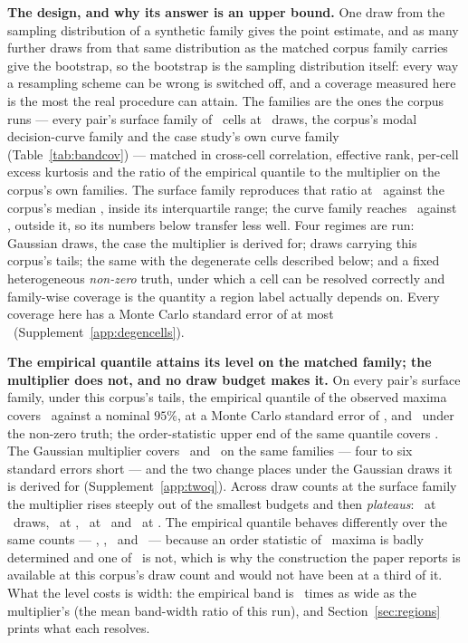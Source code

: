 \textbf{The design, and why its answer is an upper bound.} One draw from the
sampling distribution of a synthetic family gives the point estimate, and as
many further draws from that same distribution as the matched corpus family
carries give the bootstrap, so the bootstrap is the sampling distribution
itself: every way a resampling scheme can be wrong is switched off, and a
coverage measured here is the most the real procedure can attain. The
families are the ones the corpus runs --- every pair's surface family of
\nCellsPerPairMedian\ cells at \nDrawsSurface\ draws, the corpus's modal
decision-curve family and the case study's own curve family
(Table~\ref{tab:bandcov}) --- matched in cross-cell correlation, effective
rank, per-cell excess kurtosis and the ratio of the empirical quantile to the
multiplier on the corpus's own families. The surface family reproduces that
ratio at \ratioSynthWhole\ against the corpus's median \ratioCorpusWhole,
inside its interquartile range; the curve family reaches \ratioSynthDca\
against \ratioCorpusDca, outside it, so its numbers below transfer less well.
Four regimes are run: Gaussian draws, the case the multiplier is derived for;
draws carrying this corpus's tails; the same with the degenerate cells
described below; and a fixed heterogeneous \emph{non-zero} truth, under which
a cell can be resolved correctly and family-wise coverage is the quantity a
region label actually depends on. Every coverage here has a Monte Carlo
standard error of at most \bandCoverageSEMax\ (Supplement~\ref{app:degencells}).

\textbf{The empirical quantile attains its level on the matched family; the
multiplier does not, and no draw budget makes it.} On every pair's surface
family, under this corpus's tails, the empirical quantile of the observed
maxima covers \covEmpHeavyWholeAtDesign\ against a nominal $95\%$, at a
Monte Carlo standard error of \covEmpHeavyWholeAtDesignSE, and
\covEmpNonzeroWholeAtDesign\ under the non-zero truth; the order-statistic
upper end of the same quantile covers \covEmpHiHeavyWholeAtDesign. The
Gaussian multiplier covers \covMultHeavyWholeAtDesign\ and
\covMultNonzeroWholeAtDesign\ on the same families --- four to six standard
errors short --- and the two change places under the Gaussian draws it
is derived for (Supplement~\ref{app:twoq}). Across draw counts at the surface
family the multiplier rises steeply out of the smallest budgets and then
\emph{plateaus}: \covMultBootThirtyThree\ at \nBootThirtyThree\ draws,
\covMultBootOneFifty\ at \nBootOneFifty, \covMultBootFourHundred\ at
\nBootFourHundred\ and \covMultBootOneThousand\ at \nBootOneThousand. The
empirical quantile behaves differently over the same counts ---
\covEmpBootThirtyThree, \covEmpBootOneFifty, \covEmpBootFourHundred\ and
\covEmpBootOneThousand\ --- because an order statistic of \nBootThirtyThree\
maxima is badly determined and one of \nDrawsSurface\ is not, which is why
the construction the paper reports is available at this corpus's draw count
and would not have been at a third of it. What the level costs is width: the
empirical band is \widthEmpOverMultAtDesign\ times as wide as the
multiplier's (the mean band-width ratio of this run), and
Section~\ref{sec:regions} prints what each resolves.

